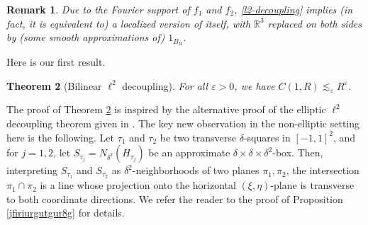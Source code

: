 \documentclass{amsart}%
\numberwithin{equation}{section}
\newtheorem{theorem}{Theorem}[section]
\newtheorem{remark}[theorem]{Remark}
\newcommand{\de}{\delta}
\newcommand{\e}{\varepsilon}
\newcommand{\R}{\mathbb{R}}
\newcommand{\1}{\mathbbm{1}}
\begin{document}
\begin{remark}
\rm

Due to the Fourier support of $f_1$ and $f_2$, \eqref{l2-decoupling} implies (in fact, it is equivalent to) a localized version of itself, with $\R^3$ replaced on both sides by (some smooth approximations of) $1_{B_R}$.
\end{remark}
Here is our first result.
\begin{theorem}[Bilinear $\ell^2$ decoupling]
\label{dec-thm}
For all $\e>0$, we have  $C(1,R)\lesssim_\e R^{\e}$.
\end{theorem}

\smallskip

The proof of Theorem \ref{dec-thm} is inspired by the alternative proof of the elliptic $\ell^2$ decoupling theorem given in \cite{FGWW}.
The key new observation in the non-elliptic setting here is the following. Let $\tau_1$ and $\tau_2$ be two transverse $\de$-squares in $[-1,1]^2$, and for $j=1,2$, let $S_{\tau_j}=N_{\de^2}(H_{\tau_j})$ be an approximate $\de\times\de\times\de^2$-box.
Then, interpreting $S_{\tau_1}$ and $S_{\tau_2}$ as $\de^2$-neighborhoods of two planes $\pi_1,\pi_2$, the intersection $\pi_1\cap\pi_2$ is a line whose  projection   onto the horizontal $(\xi,\eta)$-plane  is transverse to both coordinate directions.
We refer the reader to the proof of Proposition \ref{jfiriurgutgur8g} for details.
\end{document}
